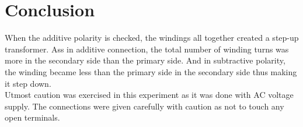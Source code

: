 \documentclass[12pt]{article}
\begin{document}
\section{Conclusion}
When the additive polarity is checked, the windings all together created a step-up transformer. Ass in additive connection, the total number of winding turns was more in the secondary side than the primary side. And in subtractive polarity, the winding became less than the primary side in the secondary side thus making it step down. \\
Utmost caution was exercised in this experiment as it was done with AC voltage supply. The connections were given carefully with caution as not to touch any open terminals.



\end{document}
